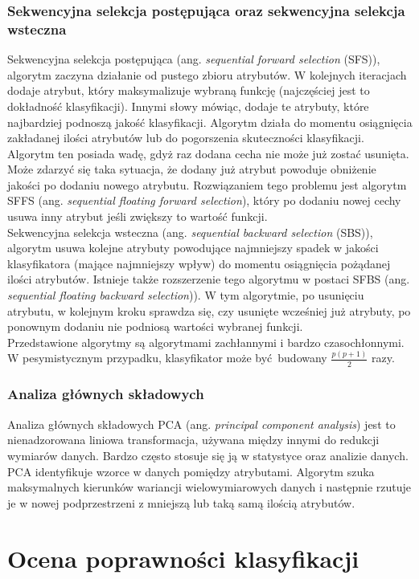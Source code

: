 \subsubsection{Sekwencyjna selekcja postępująca oraz sekwencyjna selekcja wsteczna}
Sekwencyjna selekcja postępująca (ang. \textit{sequential forward selection} (SFS)), algorytm zaczyna działanie od pustego zbioru atrybutów. W kolejnych iteracjach dodaje atrybut, który maksymalizuje wybraną funkcję (najczęściej jest to dokładność klasyfikacji). Innymi słowy mówiąc, dodaje te atrybuty, które najbardziej podnoszą jakość klasyfikacji. Algorytm działa do momentu osiągnięcia zakładanej ilości atrybutów lub do pogorszenia skuteczności klasyfikacji. Algorytm ten posiada wadę, gdyż raz dodana cecha nie może już zostać usunięta. Może zdarzyć się taka sytuacja, że dodany już atrybut powoduje obniżenie jakości po dodaniu nowego atrybutu. Rozwiązaniem tego problemu jest algorytm SFFS (ang. \textit{sequential floating forward selection}), który po dodaniu nowej cechy usuwa inny atrybut jeśli zwiększy to wartość funkcji. \\
Sekwencyjna selekcja wsteczna (ang. \textit{sequential backward selection} (SBS)), algorytm usuwa kolejne atrybuty powodujące najmniejszy spadek w jakości klasyfikatora (mające najmniejszy wpływ) do momentu osiągnięcia pożądanej ilości atrybutów. Istnieje także rozszerzenie tego algorytmu w postaci SFBS (ang. \textit{sequential floating backward selection})). W tym algorytmie, po usunięciu atrybutu, w kolejnym kroku sprawdza się, czy usunięte wcześniej już atrybuty, po ponownym dodaniu nie podniosą wartości wybranej funkcji. \\
Przedstawione algorytmy są algorytmami zachłannymi i bardzo czasochłonnymi. W pesymistycznym przypadku, klasyfikator może być budowany $\frac{p(p+1)}{2}$ razy.
\subsubsection{Analiza głównych składowych}
Analiza głównych składowych PCA (ang. \textit{principal component analysis}) jest to nienadzorowana liniowa transformacja, używana między innymi do redukcji wymiarów danych. Bardzo często stosuje się ją w statystyce oraz analizie danych. PCA identyfikuje wzorce w danych pomiędzy atrybutami. Algorytm szuka maksymalnych kierunków wariancji wielowymiarowych danych i następnie rzutuje je w nowej podprzestrzeni z mniejszą lub taką samą ilością atrybutów. 

\section{Ocena poprawności klasyfikacji}

